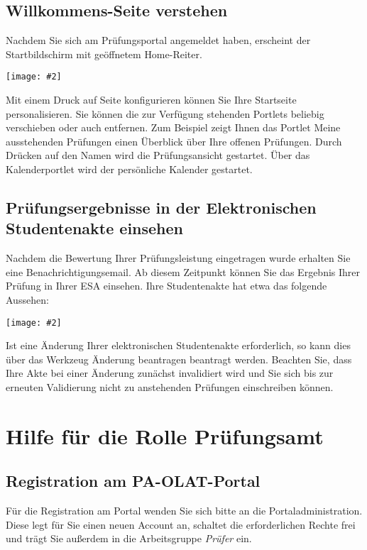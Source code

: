 \documentclass[a4paper,11pt]{article}
\newcommand{\bild}[2]{
    \begin{center}\texttt{[image: \#2]}\end{center}
}
\newcommand{\knopf}[1]{{\sc #1}}
\begin{document}
\subsection{Willkommens-Seite verstehen}

Nachdem Sie sich am Prüfungsportal angemeldet haben, erscheint der
Startbildschirm mit geöffnetem \knopf{Home}-Reiter.

\bild{.9}{Startbildschirm}

Mit einem Druck auf \knopf{Seite konfigurieren} können Sie Ihre Startseite
personalisieren. Sie können die zur Verfügung stehenden Portlets beliebig
verschieben oder auch entfernen. Zum Beispiel zeigt Ihnen das Portlet
\knopf{Meine ausstehenden Prüfungen} einen Überblick über Ihre offenen
Prüfungen.  Durch Drücken auf den Namen wird die Prüfungsansicht gestartet.
Über das Kalenderportlet wird der persönliche Kalender gestartet.

\subsection{Prüfungsergebnisse in der Elektronischen Studentenakte einsehen}

Nachdem die Bewertung Ihrer Prüfungsleistung eingetragen wurde
erhalten Sie eine Benachrichtigungsemail. Ab diesem Zeitpunkt können Sie
das Ergebnis Ihrer Prüfung in Ihrer ESA einsehen.  Ihre Studentenakte hat etwa
das folgende Aussehen:

\bild{.9}{ESA-Ansicht}

Ist eine Änderung Ihrer elektronischen Studentenakte erforderlich, so kann
dies über das Werkzeug \knopf{Änderung beantragen} beantragt werden. Beachten
Sie, dass Ihre Akte bei einer Änderung zunächst invalidiert wird und Sie sich
bis zur erneuten Validierung nicht zu anstehenden Prüfungen einschreiben
können.

\clearpage
\section{Hilfe für die Rolle Prüfungsamt}

\subsection{Registration am PA-OLAT-Portal}

Für die Registration am Portal wenden Sie sich bitte an die
Portaladministration.  Diese legt für Sie einen neuen Account an, schaltet die
erforderlichen Rechte frei und trägt Sie außerdem in die Arbeitsgruppe {\em
  Prüfer} ein.
\end{document}
